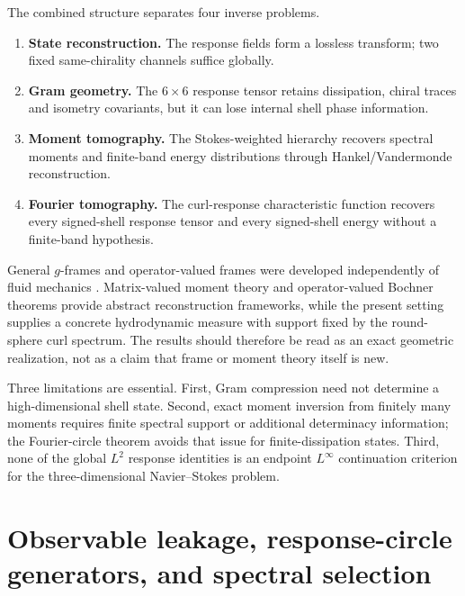 \documentclass[
 aps,
 prd,
 reprint,
 amsmath,
 amssymb,
 nofootinbib,
 superscriptaddress
]{revtex4-2}
\theoremstyle{definition}
\theoremstyle{remark}
\begin{document}
The combined structure separates four inverse problems.

\begin{enumerate}[label=(\roman*)]
\item
\textbf{State reconstruction.}
The response fields form a lossless transform; two fixed same-chirality
channels suffice globally.

\item
\textbf{Gram geometry.}
The \(6\times6\) response tensor retains dissipation, chiral traces and
isometry covariants, but it can lose internal shell phase information.

\item
\textbf{Moment tomography.}
The Stokes-weighted hierarchy recovers spectral moments and finite-band
energy distributions through Hankel/Vandermonde reconstruction.

\item
\textbf{Fourier tomography.}
The curl-response characteristic function recovers every signed-shell
response tensor and every signed-shell energy without a finite-band
hypothesis.
\end{enumerate}

General \(g\)-frames and operator-valued frames were developed independently
of fluid mechanics \cite{Sun2006,KaftalLarsonZhang2009}.  Matrix-valued
moment theory and operator-valued Bochner theorems provide abstract
reconstruction frameworks, while the present setting supplies a concrete
hydrodynamic measure with support fixed by the round-sphere curl spectrum.
The results should therefore be read as an exact geometric realization, not
as a claim that frame or moment theory itself is new.

Three limitations are essential.  First, Gram compression need not determine
a high-dimensional shell state.  Second, exact moment inversion from finitely
many moments requires finite spectral support or additional determinacy
information; the Fourier-circle theorem avoids that issue for
finite-dissipation states.  Third, none of the global \(L^2\) response
identities is an endpoint \(L^\infty\) continuation criterion for the
three-dimensional Navier--Stokes problem.



\section{Observable leakage, response-circle generators, and spectral selection}
\label{N:sec:synthesis}
\end{document}
